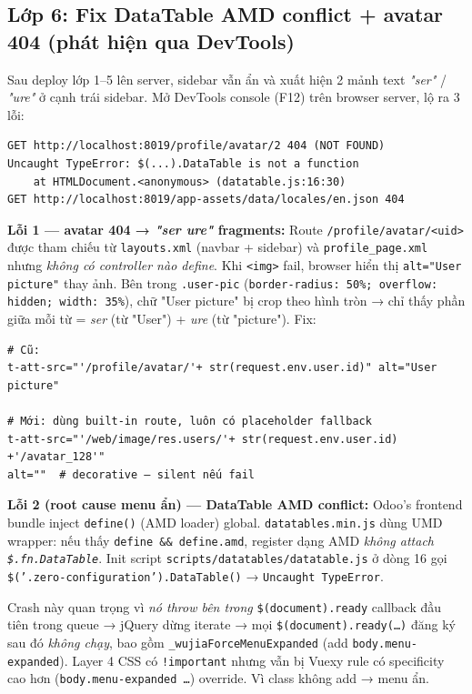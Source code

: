 \subsection{Lớp 6: Fix DataTable AMD conflict + avatar 404 (phát hiện qua DevTools)}

Sau deploy lớp 1--5 lên server, sidebar vẫn ẩn và xuất hiện 2 mảnh text \emph{"ser"} / \emph{"ure"} ở cạnh trái sidebar. Mở DevTools console (F12) trên browser server, lộ ra 3 lỗi:

\begin{lstlisting}[style=shell]
GET http://localhost:8019/profile/avatar/2 404 (NOT FOUND)
Uncaught TypeError: $(...).DataTable is not a function
    at HTMLDocument.<anonymous> (datatable.js:16:30)
GET http://localhost:8019/app-assets/data/locales/en.json 404
\end{lstlisting}

\textbf{Lỗi 1 --- avatar 404 → \emph{"ser ure"} fragments:} Route \texttt{/profile/avatar/<uid>} được tham chiếu từ \texttt{layouts.xml} (navbar + sidebar) và \texttt{profile\_page.xml} nhưng \emph{không có controller nào define}. Khi \texttt{<img>} fail, browser hiển thị \texttt{alt="User picture"} thay ảnh. Bên trong \texttt{.user-pic} (\texttt{border-radius: 50\%; overflow: hidden; width: 35\%}), chữ "User picture" bị crop theo hình tròn → chỉ thấy phần giữa mỗi từ = \emph{ser} (từ "User") + \emph{ure} (từ "picture"). Fix:

\begin{lstlisting}[style=python]
# Cũ:
t-att-src="'/profile/avatar/'+ str(request.env.user.id)" alt="User picture"

# Mới: dùng built-in route, luôn có placeholder fallback
t-att-src="'/web/image/res.users/'+ str(request.env.user.id) +'/avatar_128'"
alt=""  # decorative — silent nếu fail
\end{lstlisting}

\textbf{Lỗi 2 (root cause menu ẩn) --- DataTable AMD conflict:} Odoo's frontend bundle inject \texttt{define()} (AMD loader) global. \texttt{datatables.min.js} dùng UMD wrapper: nếu thấy \texttt{define \&\& define.amd}, register dạng AMD \emph{không attach \texttt{\$.fn.DataTable}}. Init script \texttt{scripts/datatables/datatable.js} ở dòng 16 gọi \texttt{\$('.zero-configuration').DataTable()} → \texttt{Uncaught TypeError}.

Crash này quan trọng vì \emph{nó throw bên trong} \texttt{\$(document).ready} callback đầu tiên trong queue → jQuery dừng iterate → mọi \texttt{\$(document).ready(\dots)} đăng ký sau đó \emph{không chạy}, bao gồm \texttt{\_wujiaForceMenuExpanded} (add \texttt{body.menu-expanded}). Layer 4 CSS có \texttt{!important} nhưng vẫn bị Vuexy rule có specificity cao hơn (\texttt{body.menu-expanded \dots}) override. Vì class không add → menu ẩn.

